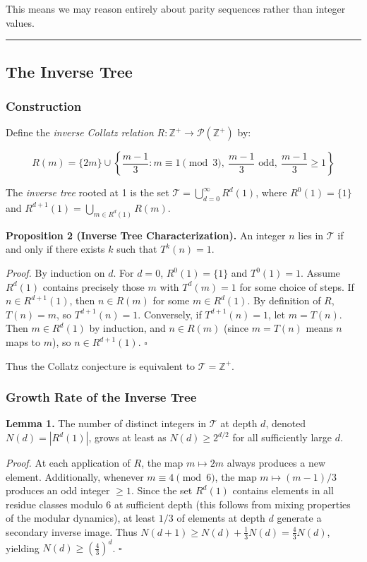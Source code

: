 \documentclass[12pt,a4paper]{article}
\begin{document}
This means we may reason entirely about parity sequences rather than integer values.

\begin{center}
\rule{0.5\textwidth}{0.4pt}
\end{center}

\subsection{The Inverse Tree}

\subsubsection{Construction}

Define the \emph{inverse Collatz relation} $R: \mathbb{Z}^+ \to \mathcal{P}(\mathbb{Z}^+)$ by:

\[R(m) = \{2m\} \cup \left\{\frac{m-1}{3} : m \equiv 1 \pmod{3},\ \frac{m-1}{3} \text{ odd},\ \frac{m-1}{3} \geq 1\right\}\]

The \emph{inverse tree} rooted at 1 is the set $\mathcal{T} = \bigcup_{d=0}^\infty R^d(1)$, where $R^0(1) = \{1\}$ and $R^{d+1}(1) = \bigcup_{m \in R^d(1)} R(m)$.

\textbf{Proposition 2 (Inverse Tree Characterization).} An integer $n$ lies in $\mathcal{T}$ if and only if there exists $k$ such that $T^k(n) = 1$.

\emph{Proof.} By induction on $d$. For $d = 0$, $R^0(1) = \{1\}$ and $T^0(1) = 1$. Assume $R^d(1)$ contains precisely those $m$ with $T^d(m) = 1$ for some choice of steps. If $n \in R^{d+1}(1)$, then $n \in R(m)$ for some $m \in R^d(1)$. By definition of $R$, $T(n) = m$, so $T^{d+1}(n) = 1$. Conversely, if $T^{d+1}(n) = 1$, let $m = T(n)$. Then $m \in R^d(1)$ by induction, and $n \in R(m)$ (since $m = T(n)$ means $n$ maps to $m$), so $n \in R^{d+1}(1)$. $\square$

Thus the Collatz conjecture is equivalent to $\mathcal{T} = \mathbb{Z}^+$.

\subsubsection{Growth Rate of the Inverse Tree}

\textbf{Lemma 1.} The number of distinct integers in $\mathcal{T}$ at depth $d$, denoted $N(d) = |R^d(1)|$, grows at least as $N(d) \geq 2^{d/2}$ for all sufficiently large $d$.

\emph{Proof.} At each application of $R$, the map $m \mapsto 2m$ always produces a new element. Additionally, whenever $m \equiv 4 \pmod{6}$, the map $m \mapsto (m-1)/3$ produces an odd integer $\geq 1$. Since the set $R^d(1)$ contains elements in all residue classes modulo 6 at sufficient depth (this follows from mixing properties of the modular dynamics), at least $1/3$ of elements at depth $d$ generate a secondary inverse image. Thus $N(d+1) \geq N(d) + \frac{1}{3}N(d) = \frac{4}{3}N(d)$, yielding $N(d) \geq \left(\frac{4}{3}\right)^d$. $\square$
\end{document}
